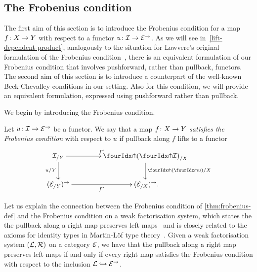 \documentclass[reqno,10pt,a4paper,oneside,draft]{amsart}
\begin{document}
\subsection*{The Frobenius condition}

The first aim of this section is to introduce the Frobenius condition for a map $f \co X \to Y$ with respect to a functor $u \co \cal{I} \to \catE^\to$.
As we will see in~\cref{lift-dependent-product}, analogously to the situation for Lawvere's original formulation of the Frobenius condition~\cite{lawvere-equality}, there is an equivalent formulation of our Frobenius condition that involves pushforward, rather than pullback, functors.
The second aim of this section is to introduce a counterpart of the well-known Beck-Chevalley conditions in our setting.
Also for this condition, we will provide an equivalent formulation, expressed using pushforward rather than pullback.

\medskip

We begin by introducing the Frobenius condition.

\begin{definition} \label{thm:frobenius-def}
Let $u \co \cal{I} \to \catE^\to$ be a functor.
We say that a map $f \co X \to Y$ \emph{satisfies the Frobenius condition} with respect to $u$ if pullback along $f$ lifts to a functor
\[
\xymatrix@C=1.5cm{
  \cal{I}_{/Y}
  \ar[r]^{f^*}
  \ar[d]_{u/Y}
&
  \liftl{ ( \liftr{\cal{I}} )}_{/X}
  \ar[d]^{\liftl{(\liftr{u})/X}}
\\
  (\catE_{/Y})^\to \ar[r]_{f^*}
&
  (\catE_{/X})^\to \rlap{.}
}
\]
\end{definition}

Let us explain the connection between the Frobenius condition of \cref{thm:frobenius-def} and the Frobenius condition on a weak factorisation system, which states the the pullback along a right map preserves left maps~\cite{garner:types-omega-groupoids,garner:topological-simplicial} and is closely related to the axioms for identity types in Martin-L\"of type theory~\cite{gambino-garner:idtypewfs}.
Given a weak factorisation system $(\cal{L}, \cal{R})$ on a category $\catE$, we have that the pullback along a right map preserves left maps if and only if every right map satisfies the Frobenius condition with respect to the inclusion $\cal{L} \hookrightarrow \catE^\to$.
\end{document}
